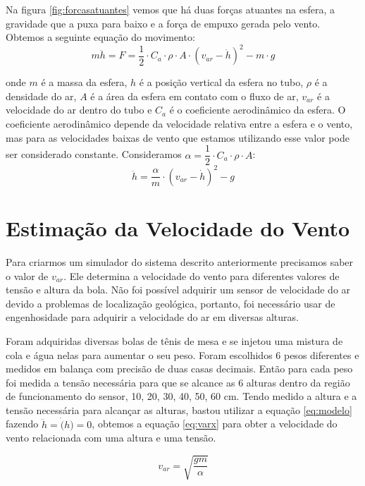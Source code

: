 Na figura \ref{fig:forcasatuantes} vemos que há duas forças atuantes na esfera, a gravidade que a puxa para baixo e a força de empuxo gerada pelo vento. Obtemos a seguinte equação do movimento:
\begin{equation}
m \ddot{h}=F=\dfrac{1}{2} \cdot C_a \cdot\rho \cdot A \cdot (v_{ar}- \dot{h})^2-m\cdot g
\end{equation}

onde $m$ é a massa da esfera, $h$ é a posição vertical da esfera no tubo, $\rho$ é a densidade do ar, $A$ é a área da esfera em contato com o fluxo de ar, $v_{ar}$ é a velocidade do ar dentro do tubo e $C_a$ é o coeficiente aerodinâmico da esfera. O coeficiente aerodinâmico depende da velocidade relativa entre a esfera e o vento, mas para as velocidades baixas de vento que estamos utilizando esse valor pode ser considerado constante. Consideramos $\alpha= \dfrac{1}{2} \cdot C_a \cdot \rho \cdot A$:
\begin{equation} \label{eq:modelo}
\ddot{h}=\dfrac{\alpha}{m}\cdot (v_{ar}-\dot{h})^2-g
\end{equation}

\section{Estimação da Velocidade do Vento}

Para criarmos um simulador do sistema descrito anteriormente precisamos saber o valor de $v_{ar}$. Ele determina a velocidade do vento para diferentes valores de tensão e altura da bola. Não foi possível adquirir um sensor de velocidade do ar devido a problemas de localização geológica, portanto, foi necessário usar de engenhosidade para adquirir a velocidade do ar em diversas alturas.


Foram adquiridas diversas bolas de tênis de mesa e se injetou uma mistura de cola e água nelas para aumentar o seu peso. Foram escolhidos 6 pesos diferentes e medidos em balança com precisão de duas casas decimais. Então para cada peso foi medida a tensão necessária para que se alcance as 6 alturas dentro da região de funcionamento do sensor, 10, 20, 30, 40, 50, 60 cm. Tendo medido a altura e a tensão necessária para alcançar as alturas, bastou utilizar a equação \eqref{eq:modelo} fazendo $\ddot{h}=\dot(h)=0$, obtemos a equação \ref{eq:varx} para obter a velocidade do vento relacionada com uma altura e uma tensão.

\begin{equation}\label{eq:varx}
v_{ar}=\sqrt{\dfrac{gm}{\alpha}}
\end{equation}

